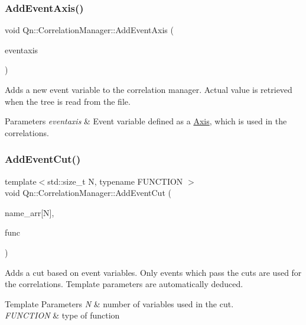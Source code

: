 \subsubsection{\texorpdfstring{Add\+Event\+Axis()}{AddEventAxis()}}
{\footnotesize\ttfamily void Qn\+::\+Correlation\+Manager\+::\+Add\+Event\+Axis (\begin{DoxyParamCaption}\item[{const \mbox{\hyperlink{classQn_1_1Axis}{Axis}} \&}]{eventaxis }\end{DoxyParamCaption})}

Adds a new event variable to the correlation manager. Actual value is retrieved when the tree is read from the file. 
\begin{DoxyParams}{Parameters}
{\em eventaxis} & Event variable defined as a \mbox{\hyperlink{classQn_1_1Axis}{Axis}}, which is used in the correlations. \\
\hline
\end{DoxyParams}
\mbox{\label{classQn_1_1CorrelationManager_ae60f0303106e4ce9e30d62a9a4008108}} 
\subsubsection{\texorpdfstring{Add\+Event\+Cut()}{AddEventCut()}}
{\footnotesize\ttfamily template$<$std\+::size\+\_\+t N, typename F\+U\+N\+C\+T\+I\+ON $>$ \\
void Qn\+::\+Correlation\+Manager\+::\+Add\+Event\+Cut (\begin{DoxyParamCaption}\item[{const char $\ast$const (\&)}]{name\+\_\+arr\mbox{[}\+N\mbox{]},  }\item[{F\+U\+N\+C\+T\+I\+ON \&\&}]{func }\end{DoxyParamCaption})\hspace{0.3cm}{\ttfamily [inline]}}



Adds a cut based on event variables. Only events which pass the cuts are used for the correlations. Template parameters are automatically deduced. 


\begin{DoxyTemplParams}{Template Parameters}
{\em N} & number of variables used in the cut. \\
\hline
{\em F\+U\+N\+C\+T\+I\+ON} & type of function \\
\hline
\end{DoxyTemplParams}

